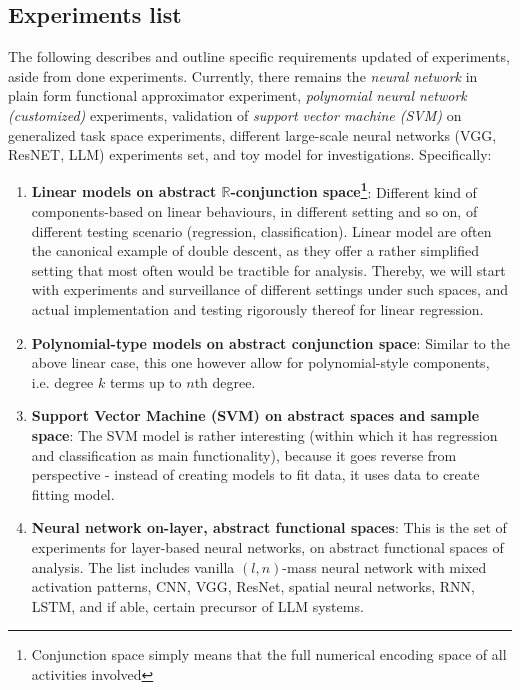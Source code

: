 \subsection{Experiments list}

The following describes and outline specific requirements updated of experiments, aside from done experiments. Currently, there remains the \textit{neural network} in plain form functional approximator experiment, \textit{polynomial neural network (customized)} experiments, validation of \textit{support vector machine (SVM)} on generalized task space experiments, different large-scale neural networks (VGG, ResNET, LLM) experiments set, and toy model for investigations. Specifically:

\begin{enumerate}[itemsep=1pt,topsep=1pt]
    \item \textbf{Linear models on abstract $\mathbb{R}$-conjunction space\footnote{Conjunction space simply means that the full numerical encoding space of all activities involved}}: Different kind of components-based on linear behaviours, in different setting and so on, of different testing scenario (regression, classification). 
\noindent Linear model are often the canonical example of double descent, as they offer a rather simplified setting that most often would be tractible for analysis. Thereby, we will start with experiments and surveillance of different settings under such spaces, and actual implementation and testing rigorously thereof for linear regression. 

    \item \textbf{Polynomial-type models on abstract conjunction space}: Similar to the above linear case, this one however allow for polynomial-style components, i.e. degree $k$ terms up to $n$th degree. 
    \item \textbf{Support Vector Machine (SVM) on abstract spaces and sample space}: The SVM model is rather interesting (within which it has regression and classification as main functionality), because it goes reverse from perspective - instead of creating models to fit data, it uses data to create fitting model. 
    \item \textbf{Neural network on-layer, abstract functional spaces}: This is the set of experiments for layer-based neural networks, on abstract functional spaces of analysis. The list includes vanilla $(l,n)$-mass neural network with mixed activation patterns, CNN, VGG, ResNet, spatial neural networks, RNN, LSTM, and if able, certain precursor of LLM systems. 
\end{enumerate}

